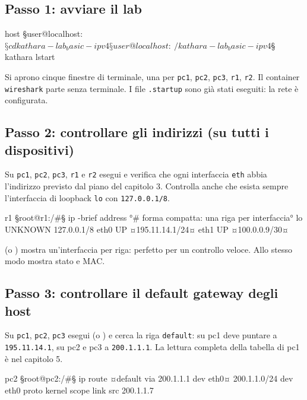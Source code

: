 
\subsection{Passo 1: avviare il lab}
\begin{terminale}{host}
§user@localhost:~$§ cd kathara-lab_basic-ipv4
§user@localhost:~/kathara-lab_basic-ipv4$§ kathara lstart
\end{terminale}
Si aprono cinque finestre di terminale, una per \texttt{pc1}, \texttt{pc2}, \texttt{pc3}, \texttt{r1}, \texttt{r2}. Il container \texttt{wireshark} parte senza terminale. I file \texttt{.startup} sono già stati eseguiti: la rete è configurata.

\subsection{Passo 2: controllare gli indirizzi (su tutti i dispositivi)}
Su \texttt{pc1}, \texttt{pc2}, \texttt{pc3}, \texttt{r1} e \texttt{r2} esegui  e verifica che ogni interfaccia \texttt{eth} abbia l'indirizzo previsto dal piano del capitolo 3. Controlla anche che esista sempre l'interfaccia di loopback \texttt{lo} con \texttt{127.0.0.1/8}.
\begin{terminale}{r1}
§root@r1:/#§ ip -brief address       °# forma compatta: una riga per interfaccia°
lo        UNKNOWN   127.0.0.1/8
eth0      UP        ¤195.11.14.1/24¤
eth1      UP        ¤100.0.0.9/30¤
\end{terminale}
\begin{mlbox}
 (o ) mostra un'interfaccia per riga: perfetto per un controllo veloce. Allo stesso modo  mostra stato e MAC.
\end{mlbox}

\subsection{Passo 3: controllare il default gateway degli host}
Su \texttt{pc1}, \texttt{pc2}, \texttt{pc3} esegui  (o ) e cerca la riga \texttt{default}: su pc1 deve puntare a \texttt{195.11.14.1}, su pc2 e pc3 a \texttt{200.1.1.1}. La lettura completa della tabella di pc1 è nel capitolo 5.
\begin{terminale}{pc2}
§root@pc2:/#§ ip route
¤default via 200.1.1.1 dev eth0¤
200.1.1.0/24 dev eth0 proto kernel scope link src 200.1.1.7
\end{terminale}

